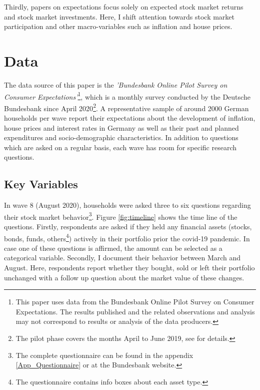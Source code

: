 \documentclass[ProjectABM]{subfiles}
\begin{document}
Thirdly, papers on expectations focus solely on expected stock market returns and stock market investments. Here, I shift attention towards stock market participation and other macro-variables such as inflation and house prices.


\section{Data}\label{sec:data}

The data source of this paper is the \textit{'Bundesbank Online Pilot Survey on Consumer Expectations'}\footnote{This paper uses data from the Bundesbank Online Pilot Survey on Consumer Expectations. The results published and the related observations and analysis may not correspond to results or analysis of the data producers.}, which is a monthly survey conducted by the Deutsche Bundesbank since April 2020\footnote{The pilot phase covers the months April to June 2019, see \cite{bundesbank_2020} for details.}. A representative sample of around 2000 German households per wave report their expectations about the development of inflation, house prices and interest rates in Germany as well as their past and planned expenditures and socio-demographic characteristics. In addition to questions which are asked on a regular basis, each wave has room for specific research questions.

\subsection{Key Variables}
In wave 8 (August 2020), households were asked three to six questions regarding their stock market behavior\footnote{The complete questionnaire can be found in the appendix \ref{App_Questionnaire} or at the Bundesbank website.}. Figure \ref{fig:timeline} shows the time line of the questions. Firstly, respondents are asked if they held any financial assets (stocks, bonds, funds, others\footnote{The questionnaire contains info boxes about each asset type.}) actively in their portfolio prior the covid-19 pandemic. In case one of these questions is affirmed, the amount can be selected as a categorical variable. Secondly, I document their behavior between March and August. Here, respondents report whether they bought, sold or left their portfolio unchanged with a follow up question about the market value of these changes. %
\end{document}
